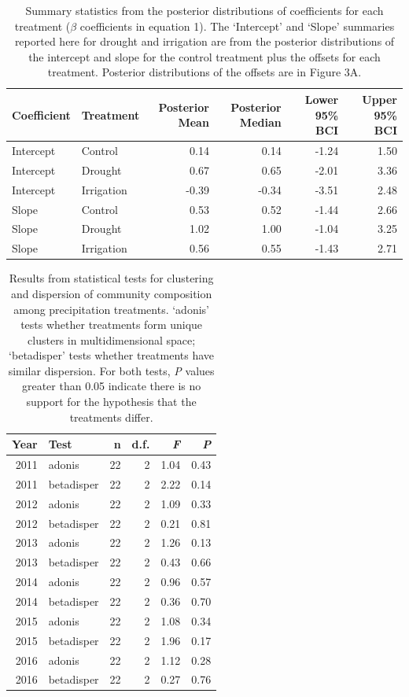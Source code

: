 \documentclass[fleqn,10pt,lineno]{wlpeerj} %
\begin{document}
\begin{table}[ht]
\centering
\caption{Summary statistics from the posterior distributions of coefficients for each treatment ($\beta$ coefficients in equation 1). The `Intercept' and `Slope' summaries reported here for drought and irrigation are from the posterior distributions of the intercept and slope for the control treatment plus the offsets for each treatment. Posterior distributions of the offsets are in Figure 3A.} 
\begingroup\normalsize
\begin{tabular}{llrrrr}
  \hline
Coefficient & Treatment & Posterior Mean & Posterior Median & Lower 95\% BCI & Upper 95\% BCI \\ 
  \hline
Intercept & Control & 0.14 & 0.14 & -1.24 & 1.50 \\ 
  Intercept & Drought & 0.67 & 0.65 & -2.01 & 3.36 \\ 
  Intercept & Irrigation & -0.39 & -0.34 & -3.51 & 2.48 \\ 
  Slope & Control & 0.53 & 0.52 & -1.44 & 2.66 \\ 
  Slope & Drought & 1.02 & 1.00 & -1.04 & 3.25 \\ 
  Slope & Irrigation & 0.56 & 0.55 & -1.43 & 2.71 \\ 
   \hline
\end{tabular}
\endgroup
\end{table}\begin{table}[ht]
\centering
\caption{Results from statistical tests for clustering and dispersion of community composition among precipitation treatments. `adonis' tests whether treatments form unique clusters in multidimensional space; `betadisper' tests whether treatments have similar dispersion. For both tests, \emph{P} values greater than 0.05 indicate there is no support for the hypothesis that the treatments differ.} 
\begingroup\normalsize
\begin{tabular}{rlrrrr}
  \hline
Year & Test & n & d.f. & \emph{F} & \emph{P} \\ 
  \hline
2011 & adonis &  22 &   2 & 1.04 & 0.43 \\ 
  2011 & betadisper &  22 &   2 & 2.22 & 0.14 \\ 
  2012 & adonis &  22 &   2 & 1.09 & 0.33 \\ 
  2012 & betadisper &  22 &   2 & 0.21 & 0.81 \\ 
  2013 & adonis &  22 &   2 & 1.26 & 0.13 \\ 
  2013 & betadisper &  22 &   2 & 0.43 & 0.66 \\ 
  2014 & adonis &  22 &   2 & 0.96 & 0.57 \\ 
  2014 & betadisper &  22 &   2 & 0.36 & 0.70 \\ 
  2015 & adonis &  22 &   2 & 1.08 & 0.34 \\ 
  2015 & betadisper &  22 &   2 & 1.96 & 0.17 \\ 
  2016 & adonis &  22 &   2 & 1.12 & 0.28 \\ 
  2016 & betadisper &  22 &   2 & 0.27 & 0.76 \\ 
   \hline
\end{tabular}
\endgroup
\end{table}
\end{document}
